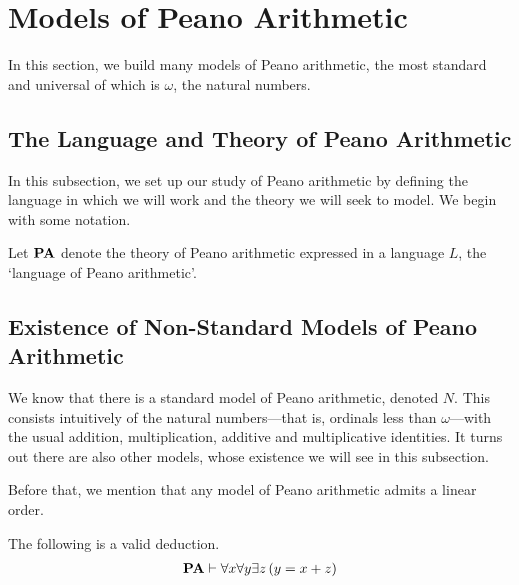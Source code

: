 \section{Models of Peano Arithmetic}

In this section, we build many models of Peano arithmetic, the most standard and universal of which is $\omega$, the natural numbers.

\subsection{The Language and Theory of Peano Arithmetic}

In this subsection, we set up our study of Peano arithmetic by defining the language in which we will work and the theory we will seek to model. We begin with some notation.

\begin{boxnotation}
    Let $\mathbf{PA}$ denote the theory of Peano arithmetic expressed in a language $L$, the `language of Peano arithmetic'.
\end{boxnotation}

\sorry

\subsection{Existence of Non-Standard Models of Peano Arithmetic}

We know that there is a standard model of Peano arithmetic, denoted $N$. This consists intuitively of the natural numbers---that is, ordinals less than $\omega$---with the usual addition, multiplication, additive and multiplicative identities. It turns out there are also other models, whose existence we will see in this subsection.

Before that, we mention that any model of Peano arithmetic admits a linear order.

\begin{boxtheorem}
    The following is a valid deduction.
    \begin{align*}
        \mathbf{PA} \vdash \forall x \forall y \exists z \left( y = x + z \right)
    \end{align*}
\end{boxtheorem}

